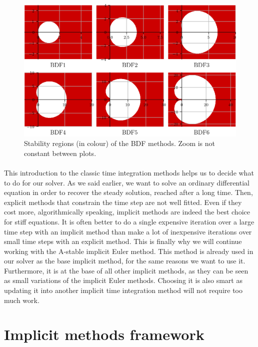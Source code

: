         \begin{figure}
          \centering
          \includegraphics{figures/bdf_stab.png}
          \caption{Stability regions (in colour) of the BDF methods. Zoom is not constant between plots.}
          \label{fig:bdf_stab}
        \end{figure}

      \paragraph{}
      This introduction to the classic time integration methods helps us to decide what to do for our solver.
      As we said earlier, we want to solve an ordinary differential equation in order to recover the steady solution, reached after a long time.
      Then, explicit methods that constrain the time step are not well fitted.
      Even if they cost more, algorithmically speaking, implicit methods are indeed the best choice for stiff equations.
      It is often better to do a single expensive iteration over a large time step with an implicit method than make a lot of inexpensive iterations over small time steps with an explicit method.
      This is finally why we will continue working with the A-stable implicit Euler method.
      This method is already used in our solver as the base implicit method, for the same reasons we want to use it.
      Furthermore, it is at the base of all other implicit methods, as they can be seen as small variations of the implicit Euler methods.
      Choosing it is also smart as updating it into another implicit time integration method will not require too much work.


  \section{Implicit methods framework}

